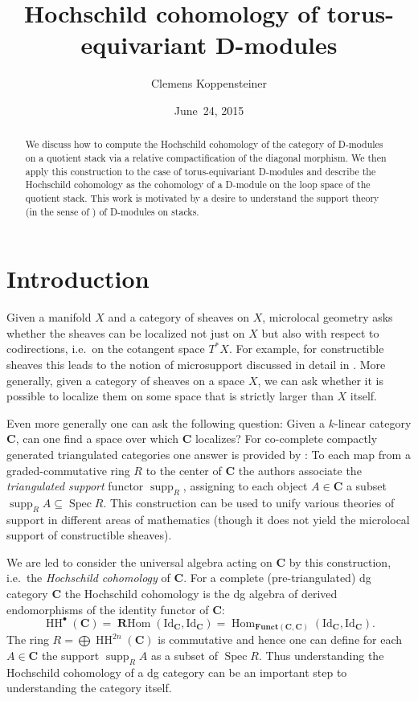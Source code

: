 \documentclass[english]{ck-article}
\title{Hochschild cohomology of torus-equivariant D-modules}
\author{Clemens Koppensteiner}
\date{June~24, 2015}
\newcommand\cat{\mathbf}
\DeclareMathOperator\Hom{Hom}
\newcommand\id[1][]{{\mathrm{Id}_{#1}}}
\DeclareMathOperator\Spec{Spec}
\DeclareMathOperator\supp{supp}
\newcommand\cx\bullet
\newcommand\ΓdR{Γ_{\mkern-4mu\dR}}
\newcommand{\HCoh}{\operatorname{HH}^\cx}
\newcommand\Γsub[1]{\Gamma_{\mkern-3mu#1}}
\begin{document}
\maketitle

\begin{abstract}
    We discuss how to compute the Hochschild cohomology of the category of D-modules on a quotient stack via a relative compactification of the diagonal morphism.
    We then apply this construction to the case of torus-equivariant D-modules and describe the Hochschild cohomology as the cohomology of a D-module on the loop space of the quotient stack.
    This work is motivated by a desire to understand the support theory (in the sense of \cite{BensonIyengarKrause:2008:LocalCohomologyAndSupportForTriangulatedCategories}) of D-modules on stacks.
\end{abstract}

\section{Introduction}

Given a manifold $X$ and a category of sheaves on $X$, microlocal geometry asks whether the sheaves can be localized not just on $X$ but also with respect to codirections, i.e.~on the cotangent space $T^*X$.
For example, for constructible sheaves this leads to the notion of microsupport discussed in detail in \cite{KashiwaraSchapira:1994:SheavesOnManifolds}.
More generally, given a category of sheaves on a space $X$, we can ask whether it is possible to localize them on some space that is strictly larger than $X$ itself.

Even more generally one can ask the following question: Given a $k$-linear category $\cat C$, can one find a space over which $\cat C$ localizes?
For co-complete compactly generated triangulated categories one answer is provided by \cite{BensonIyengarKrause:2008:LocalCohomologyAndSupportForTriangulatedCategories}:
To each map from a graded-commutative ring $R$ to the center of $\cat C$ the authors associate the \emph{triangulated support} functor $\supp_R$, assigning to each object $A ∈ \cat C$ a subset $\supp_R A \subseteq \Spec R$.
This construction can be used to unify various theories of support in different areas of mathematics (though it does not yield the microlocal support of constructible sheaves).

We are led to consider the universal algebra acting on $\cat C$ by this construction, i.e.~the \emph{Hochschild cohomology} of $\cat C$.
For a complete (pre-triangulated) dg category $\cat C$ the Hochschild cohomology is the dg algebra of derived endomorphisms of the identity functor of $\cat C$:
\[
    \HCoh(\cat C)
    = \operatorname{\mathbf{R}Hom}(\id[\cat C], \id[\cat C])
    = \Hom_{\cat{Funct}(\cat C, \cat C)}(\id[\cat C], \id[\cat C]).
\]
The ring $R = \bigoplus \operatorname{HH}^{2n}(\cat C)$ is commutative and hence one can define for each $A ∈ \cat C$ the support $\supp_R A$ as a subset of $\Spec R$.
Thus understanding the Hochschild cohomology of a dg category can be an important step to understanding the category itself.
\end{document}
